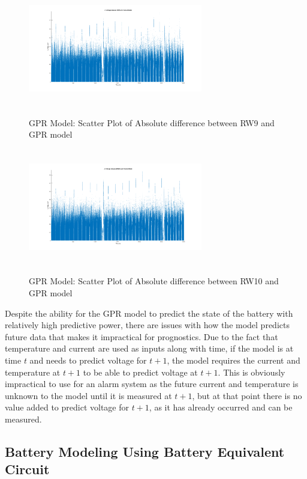 \begin{figure}
\begin{multicols}{2}
	\includegraphics[height=2in, width=3in]{figures/GPR/rw9_abs_v_diff}
	\caption{GPR Model: Scatter Plot of Absolute difference between RW9 and GPR model}
	\label{fig:rw9_abs_v_diff}
	\includegraphics[height=2in, width=3in]{figures/GPR/rw10_abs_v_diff}
	\caption{GPR Model: Scatter Plot of Absolute difference between RW10 and GPR model}
	\label{fig:rw10_abs_v_diff}
\end{multicols}
\end{figure}

Despite the ability for the GPR model to predict the state of the battery with relatively high predictive power, there are issues with how the model predicts future data that makes it impractical for prognostics.  Due to the fact that temperature and current are used as inputs along with time, if the model is at time $t$ and needs to predict voltage for $t+1$, the model requires the current and temperature at $t+1$ to be able to predict voltage at $t+1$.  This is obviously impractical to use for an alarm system as the future current and temperature is unknown to the model until it is measured at $t+1$, but at that point there is no value added to predict voltage for $t+1$, as it has already occurred and can be measured.

\subsection{Battery Modeling Using Battery Equivalent Circuit}

